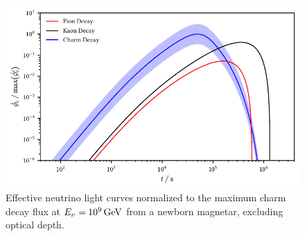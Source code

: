 \begin{figure}[H]
	\centering
	\includegraphics{../plots/build/magnetar_neutrino_spectrum_without.pdf}
	\caption[Magnetar $\nu \kern+0.5pt$ flux compared to $c$ decay without optical depth.]
			{Effective neutrino light curves normalized to the maximum charm decay flux at
			 $E_\nu = \kern-0.5pt \qty{e9}{\giga\electronvolt}$ from a newborn magnetar, excluding optical depth.}
	\label{fig:magnetar-flux-without}
\end{figure}
